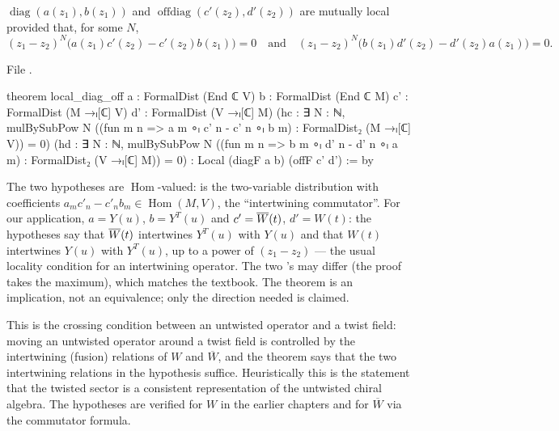 \begin{theorem}\label{ch10:thm:diagoff}
$\operatorname{diag}(a(z_1),b(z_1))$ and $\operatorname{offdiag}(c'(z_2),d'(z_2))$ are mutually
local provided that, for some $N$,
\begin{equation*}
  (z_1-z_2)^N\bigl(a(z_1)c'(z_2)-c'(z_2)b(z_1)\bigr)=0
  \quad\text{and}\quad
  (z_1-z_2)^N\bigl(b(z_1)d'(z_2)-d'(z_2)a(z_1)\bigr)=0 .
\end{equation*}
\end{theorem}
\noindent File .
\begin{leancode}
theorem local_diag_off {a : FormalDist (End ℂ V)} {b : FormalDist (End ℂ M)}
    {c' : FormalDist (M →ₗ[ℂ] V)} {d' : FormalDist (V →ₗ[ℂ] M)}
    (hc : ∃ N : ℕ, mulBySubPow N
      ((fun m n => a m ∘ₗ c' n - c' n ∘ₗ b m) : FormalDist₂ (M →ₗ[ℂ] V)) = 0)
    (hd : ∃ N : ℕ, mulBySubPow N
      ((fun m n => b m ∘ₗ d' n - d' n ∘ₗ a m) : FormalDist₂ (V →ₗ[ℂ] M)) = 0) :
    Local (diagF a b) (offF c' d') := by
\end{leancode}
\begin{dictionary}
The two hypotheses are $\operatorname{Hom}$-valued: 
is the two-variable distribution with coefficients $a_m c'_n-c'_nb_m\in\operatorname{Hom}(M,V)$,
the ``intertwining commutator''.  For our application, $a=Y(u)$, $b=Y^T(u)$ and $c'=\overline{W}(t)$,
$d'=W(t)$: the hypotheses say that $\overline{W}(t)$ intertwines $Y^T(u)$ with $Y(u)$ and that $W(t)$
intertwines $Y(u)$ with $Y^T(u)$, up to a power of $(z_1-z_2)$ --- the usual locality condition
for an intertwining operator.  The two 's may differ (the proof takes the maximum), which
matches the textbook.  The theorem is an implication, not an equivalence; only the direction
needed is claimed.
\end{dictionary}

\begin{physics}
This is the crossing condition between an untwisted operator and a twist field: moving an untwisted operator around a twist field is controlled by the intertwining (fusion) relations of $W$ and $\overline W$, and the theorem says that the two intertwining relations in the hypothesis suffice. Heuristically this is the statement that the twisted sector is a consistent representation of the untwisted chiral algebra. The hypotheses are verified for $W$ in the earlier chapters and for $\overline W$ via the commutator formula.
\end{physics}

